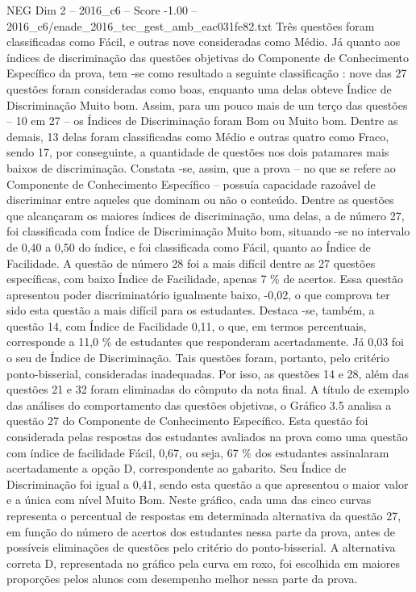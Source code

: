 \begin{textsample}{NEG Dim 2 – 2016\_c6 – Score -1.00 – 2016\_c6/enade\_2016\_tec\_gest\_amb\_eac031fe82.txt}
Três questões foram classificadas como Fácil, e outras nove consideradas como Médio.
Já quanto aos índices de discriminação das questões objetivas do Componente de Conhecimento Específico da prova, tem -se como resultado a seguinte classificação : nove das 27 questões foram consideradas como boas, enquanto uma delas obteve Índice de Discriminação Muito bom.
Assim, para um pouco mais de um terço das questões – 10 em 27 – os Índices de Discriminação foram Bom ou Muito bom.
Dentre as demais, 13 delas foram classificadas como Médio e outras quatro como Fraco, sendo 17, por conseguinte, a quantidade de questões nos dois patamares mais baixos de discriminação.
Constata -se, assim, que a prova – no que se refere ao Componente de Conhecimento Específico – possuía capacidade razoável de discriminar entre aqueles que dominam ou não o conteúdo.
Dentre as questões que alcançaram os maiores índices de discriminação, uma delas, a de número 27, foi classificada com Índice de Discriminação Muito bom, situando -se no intervalo de 0,40 a 0,50 do índice, e foi classificada como Fácil, quanto ao Índice de Facilidade.
A questão de número 28 foi a mais difícil dentre as 27 questões específicas, com baixo Índice de Facilidade, apenas 7 \% de acertos.
Essa questão apresentou poder discriminatório igualmente baixo, -0,02, o que comprova ter sido esta questão a mais difícil para os estudantes.
Destaca -se, também, a questão 14, com Índice de Facilidade 0,11, o que, em termos percentuais, corresponde a 11,0 \% de estudantes que responderam acertadamente.
Já 0,03 foi o seu de Índice de Discriminação.
Tais questões foram, portanto, pelo critério ponto-bisserial, consideradas inadequadas.
Por isso, as questões 14 e 28, além das questões 21 e 32 foram eliminadas do cômputo da nota final.
A título de exemplo das análises do comportamento das questões objetivas, o Gráfico 3.5 analisa a questão 27 do Componente de Conhecimento Específico.
Esta questão foi considerada pelas respostas dos estudantes avaliados na prova como uma questão com índice de facilidade Fácil, 0,67, ou seja, 67 \% dos estudantes assinalaram acertadamente a opção D, correspondente ao gabarito.
Seu Índice de Discriminação foi igual a 0,41, sendo esta questão a que apresentou o maior valor e a única com nível Muito Bom.
Neste gráfico, cada uma das cinco curvas representa o percentual de respostas em determinada alternativa da questão 27, em função do número de acertos dos estudantes nessa parte da prova, antes de possíveis eliminações de questões pelo critério do ponto-bisserial.
A alternativa correta D, representada no gráfico pela curva em roxo, foi escolhida em maiores proporções pelos alunos com desempenho melhor nessa parte da prova.

\end{textsample}
